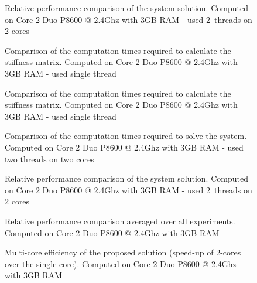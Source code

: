 \begin{figure}
\centerline{}
\caption{Relative performance comparison of the system solution. Computed on Core 2 Duo P8600 @ 2.4Ghz with 3GB RAM - used 2~threads on 2 cores}
\label{fig:sinlgeSystemc2}
\end{figure}

\begin{figure}
\centerline{}
\caption{Comparison of the computation times required to calculate the stiffness matrix. Computed on Core 2 Duo P8600 @ 2.4Ghz with 3GB RAM - used single thread}
\label{fig:multiStiffc2CT}
\end{figure}

\begin{figure}
\centerline{}
\caption{Comparison of the computation times required to calculate the stiffness matrix. Computed on Core 2 Duo P8600 @ 2.4Ghz with 3GB RAM - used single thread}
\label{fig:multiStiffc2}
\end{figure}

\begin{figure}
\centerline{}
\caption{Comparison of the computation times required to solve the system. Computed on Core 2 Duo P8600 @ 2.4Ghz with 3GB RAM - used two threads on two cores}
\label{fig:multiSystemc2CT}
\end{figure}

\begin{figure}
\centerline{}
\caption{Relative performance comparison of the system solution. Computed on Core 2 Duo P8600 @ 2.4Ghz with 3GB RAM - used 2~threads on 2 cores}
\label{fig:multiSystemc2}
\end{figure}

\begin{figure}
\centerline{}
\caption{Relative performance comparison averaged over all experiments. Computed on Core 2 Duo P8600 @ 2.4Ghz with 3GB RAM}
\label{fig:averagec2}
\end{figure}

\begin{figure}
\centerline{}
\caption{Multi-core efficiency of the proposed solution (speed-up of 2-cores over the single core). Computed on Core 2 Duo P8600 @ 2.4Ghz with 3GB RAM}
\label{fig:mcEfficiencyc2}
\end{figure}


